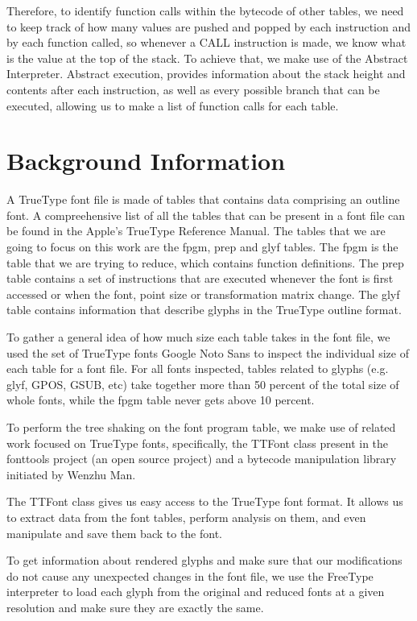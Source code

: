 \documentclass[12pt]{article}
\begin{document}
Therefore, to identify function calls within the bytecode of other tables,
we need to keep track of how many values are pushed and popped by each
instruction and by each function called, so whenever a CALL instruction
is made, we know what is the value at the top of the stack. To achieve
that, we make use of the Abstract Interpreter\cite{bytecode}. Abstract
execution, provides information about the stack height and contents
after each instruction, as well as every possible branch that can be
executed, allowing us to make a list of function calls for each table. 

\section{Background Information}

A TrueType font file is made of tables that contains data comprising an
outline font. A compreehensive list of all the tables that can be
present in a font file can be found in the Apple's TrueType Reference
Manual\cite{ttmanual}. The tables that we are going to focus on this
work are the fpgm, prep and glyf tables. The fpgm is the table that we
are trying to reduce, which contains function definitions. The prep
table contains a set of instructions that are executed whenever the font
is first accessed or when the font, point size or transformation matrix
change. The glyf table contains information that describe glyphs in the
TrueType outline format.

To gather a general idea of how much size each table takes in the font
file, we used the set of TrueType fonts Google Noto Sans\cite{notosans}
to inspect the individual size of each table for a font file. For all
fonts inspected, tables related to glyphs (e.g. glyf, GPOS, GSUB, etc)
take together more than 50 percent of the total size of whole fonts,
while the fpgm table never gets above 10 percent.  

To perform the tree shaking on the font program table,
we make use of related work focused on TrueType fonts, specifically,
the TTFont class present in the fonttools project \cite{fonttools} 
(an open source project) and a bytecode manipulation library
\cite{bytecode} initiated by Wenzhu Man. 

The TTFont class gives us easy access to the TrueType font format. It
allows us to extract data from the font tables, perform analysis on
them, and even manipulate and save them back to the font. 

To get information about rendered glyphs and make sure that
our modifications do not cause any unexpected changes in the font file,
we use the FreeType interpreter to load each glyph from the original
and reduced fonts at a given resolution and make sure they are exactly
the same. 
\end{document}
